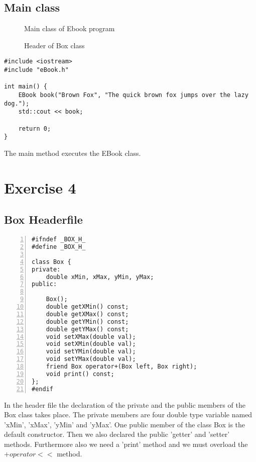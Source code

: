 \documentclass{article}
\begin{document}
\subsection{Main class}
\begin{figure}
\scriptsize{\caption{Main class of Ebook program}}
\scriptsize{\caption{Header of Box class}}
\end{figure}
\begin{lstlisting}
#include <iostream>
#include "eBook.h"

int main() {
	EBook book("Brown Fox", "The quick brown fox jumps over the lazy dog.");
	std::cout << book; 

	return 0; 
}
\end{lstlisting}
\normalsize{The main method executes the EBook class.}
\section{Exercise 4}
\subsection{Box Headerfile}

\begin{lstlisting}[basicstyle=\footnotesize\ttfamily, numbers=left, stepnumber=1, numberstyle = \normalsize]
#ifndef _BOX_H_
#define _BOX_H_

class Box {
private:
	double xMin, xMax, yMin, yMax;
public:
	
	Box();
	double getXMin() const;
	double getXMax() const;
	double getYMin() const;
	double getYMax() const;
	void setXMax(double val);
	void setXMin(double val);
	void setYMin(double val);
	void setYMax(double val);
	friend Box operator+(Box left, Box right);
	void print() const;
};
#endif
\end{lstlisting}
\normalsize{In the header file the declaration of the private and the public members of the Box class takes place.\newline
\newline
The private members are four double type variable named 'xMin', 'xMax', 'yMin' and 'yMax'.\newline
One public member of the class Box is the default constructor.\newline 
Then we also declared the public 'getter' and 'setter' methods. Furthermore also we need a 'print' method and we must overload the $+operator<<$ method.\newline
}\newpage
\end{document}
